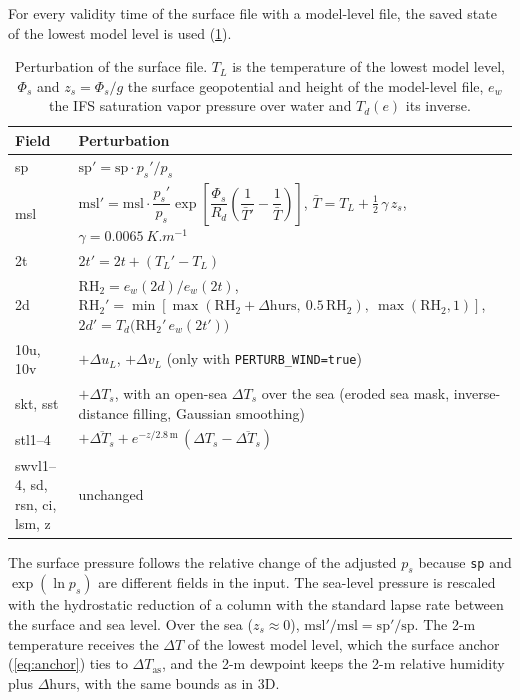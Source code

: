 \documentclass[11pt,a4paper]{article}
\newcommand{\code}[1]{\texttt{#1}}
\newcommand{\dT}{\Delta T}
\begin{document}
For every validity time of the surface file with a model-level file, the
saved state of the lowest model level is used (\cref{tab:sfc}).

\begin{table}[htbp]
\centering
\caption{Perturbation of the surface file. $T_L$ is the temperature of the
lowest model level, $\Phi_s$ and $z_s = \Phi_s/g$ the surface geopotential
and height of the model-level file, $e_w$ the IFS saturation vapor pressure
over water and $T_d(e)$ its inverse.}
\label{tab:sfc}
\small
\begin{tabularx}{\linewidth}{lX}
\toprule
Field & Perturbation \\
\midrule
sp & $\mathrm{sp}' = \mathrm{sp}\cdot p_s'/p_s$ \\
msl & $\mathrm{msl}' = \mathrm{msl}\cdot\dfrac{p_s'}{p_s}\exp\!\left[\dfrac{\Phi_s}{R_d}\left(\dfrac{1}{\bar T'}-\dfrac{1}{\bar T}\right)\right]$,
  \quad $\bar T = T_L + \tfrac{1}{2}\,\gamma\, z_s$, \quad $\gamma = \SI{0.0065}{K.m^{-1}}$ \\
2t & $2t' = 2t + (T_L' - T_L)$ \\
2d & $\mathrm{RH}_2 = e_w(2d)/e_w(2t)$, \quad
  $\mathrm{RH}_2' = \min[\max(\mathrm{RH}_2+\Delta\mathrm{hurs},\ 0.5\,\mathrm{RH}_2),\ \max(\mathrm{RH}_2,1)]$, \quad
  $2d' = T_d\bigl(\mathrm{RH}_2'\, e_w(2t')\bigr)$ \\
10u, 10v & $+\Delta u_L$, $+\Delta v_L$ (only with \code{PERTURB\_WIND=true}) \\
skt, sst & $+\Delta T_s$, with an open-sea $\Delta T_s$ over the sea (eroded
  sea mask, inverse-distance filling, Gaussian smoothing) \\
stl1--4 & $+\overline{\Delta T_s} + e^{-z/2.8\,\mathrm{m}}\,(\Delta T_s - \overline{\Delta T_s})$ \\
swvl1--4, sd, rsn, ci, lsm, z & unchanged \\
\bottomrule
\end{tabularx}
\end{table}

The surface pressure follows the relative change of the adjusted $p_s$
because \code{sp} and $\exp(\ln p_s)$ are different fields in the input. The
sea-level pressure is rescaled with the hydrostatic reduction of a column
with the standard lapse rate between the surface and sea level. Over the sea
($z_s \approx 0$), $\mathrm{msl}'/\mathrm{msl} = \mathrm{sp}'/\mathrm{sp}$.
The 2-m temperature receives the $\dT$ of the lowest model level, which the
surface anchor (\cref{eq:anchor}) ties to $\Delta T_{\mathrm{as}}$, and the
2-m dewpoint keeps the 2-m relative humidity plus $\Delta\mathrm{hurs}$, with
the same bounds as in 3D.
\end{document}
